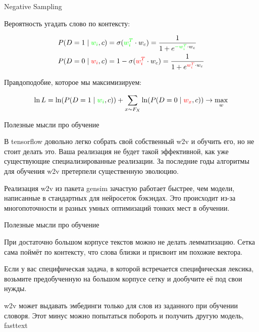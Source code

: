 \documentclass[notes,12pt, aspectratio=169]{beamer}
\newenvironment{wideitemize}{\itemize\addtolength{\itemsep}{10pt}}{\enditemize}
\begin{document}
\begin{frame}{Negative Sampling}

Вероятность угадать слово по контексту: 

\begin{equation*} 
\begin{aligned}
&P(D = 1 \mid {\color{green} w_i}, c) = \sigma({\color{green} w_i^T} \cdot w_c) = \frac{1}{1 + e^{{\color{green} - w_i^T} \cdot w_c}}\\
&P(D = 0 \mid {\color{red} w_i}, c) = 1 - \sigma({\color{red} w_i^T} \cdot w_c) = \frac{1}{1 + e^{{\color{red} w_i^T} \cdot w_c}}\\
\end{aligned}
\end{equation*}

Правдоподобие, которое мы максимизируем: 

\[
\ln L  = \ln(P(D = 1 \mid {\color{green} w_i}, c)) + \sum_{x \sim F_X} \ln(P(D = 0 \mid {\color{red} w_x}, c)) \to \max_w  
\]
\end{frame} 


\begin{frame}{Полезные мысли про обучение}
\begin{wideitemize} 
	\item В tensorflow довольно легко собрать свой собственный w2v и обучить его, но не стоит делать это.  Ваша реализация не будет такой эффективной, как уже существующие специализированные реализации. За последние годы алгоритмы для обучения w2v претерпели существенную эволюцию. 
	
	\item   Реализация w2v из пакета gensim зачастую работает быстрее, чем модели, написанные в стандартных для нейросеток бэкэндах. Это происходит из-за многопоточности и разных умных оптимизаций тонких мест в обучении. 
\end{wideitemize} 
\end{frame} 



\begin{frame}{Полезные мысли про обучение}
\begin{wideitemize} 
\item  При достаточно большом корпусе текстов можно не делать лемматизацию. Сетка сама поймёт по контексту, что слова близки и присвоит им похожие вектора.

\item Если у вас специфическая задача, в которой встречается специфическая лексика, возьмите предобученную на большом корпусе сетку и дообучите её под свои нужды.

\item \alert{w2v может выдавать эмбединги только для слов из заданного при обучении словоря.} Этот минус можно попытаться побороть и получить другую модель, fasttext
\end{wideitemize} 
\end{frame} 
\end{document}
